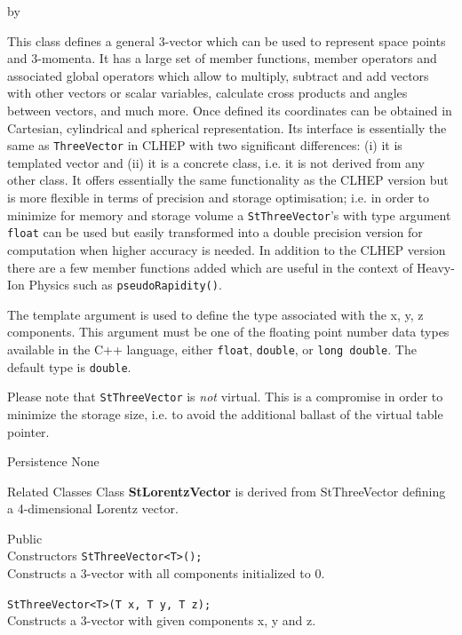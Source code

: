 \documentclass[twoside]{article}
\newcommand{\comp}[1]{\texttt{#1}}%
\newcommand{\entrylabel}[1]{\mbox{\textbf{{#1}}}\hfil}%
\newenvironment{entry}
{\begin{list}{}%
    {\renewcommand{\makelabel}{\entrylabel}%
     \setlength{\labelwidth}{90pt}%
     \setlength{\leftmargin}{\labelwidth}
     \advance\leftmargin by \labelsep%
      }%
    }%
  {\end{list}}
\newcommand{\Entrylabel}[1]%
{\raisebox{0pt}[1ex][0pt]{\makebox[\labelwidth][l]%
    {\parbox[t]{\labelwidth}{\hspace{0pt}\textbf{{#1}}}}}}
\newenvironment{Entry}%
{\renewcommand{\entrylabel}{\Entrylabel}\begin{entry}}%
  {\end{entry}}
\begin{document}
\begin{description}
\begin{Entry}
    This class defines a general 3-vector which can be used to
    represent space points and 3-momenta.  It has a large set of
    member functions, member operators and associated global operators
    which allow to multiply, subtract and add vectors with other
    vectors or scalar variables, calculate cross products and angles
    between vectors, and much more. Once defined its coordinates can
    be obtained in Cartesian, cylindrical and spherical
    representation.  Its interface is essentially the same as
    \comp{ThreeVector} in CLHEP  with two significant differences:
    (i) it is templated vector and (ii) it is a concrete class, i.e.
    it is not derived from any other class.  It offers essentially the
    same functionality as the CLHEP version but is more flexible in
    terms of precision and storage optimisation; i.e. in order to
    minimize for memory and storage volume a \comp{StThreeVector}'s
    with type argument \comp{float} can be used but easily
    transformed into a double precision version for computation when
    higher accuracy is needed.  In addition to the CLHEP version there
    are a few member functions added which are useful in the context
    of Heavy-Ion Physics such as \comp{pseudoRapidity()}.

    The template argument is used to define the type associated with
    the x, y, z components. This argument must be one of the floating
    point number data types available in the C++ language, either
    \comp{float}, \comp{double}, or \comp{long double}. The
    default type is \comp{double}.
    
    Please note that \comp{StThreeVector} is {\em not} virtual. This
    is a compromise in order to minimize the storage size, i.e. to
    avoid the additional ballast of the virtual table pointer.
\item[Persistence]
    None

\item[Related Classes]
    Class {\bf StLorentzVector} 
    is derived from StThreeVector
    defining a 4-dimensional Lorentz vector. 

\item[Public\\ Constructors]
    \verb+StThreeVector<T>();+ \\
    Constructs a 3-vector with all components initialized to 0.
    
    \verb+StThreeVector<T>(T x, T y, T z);+ \\
    Constructs a 3-vector with given components x, y and z.
    

\end{Entry}
\end{description}
\end{document}
